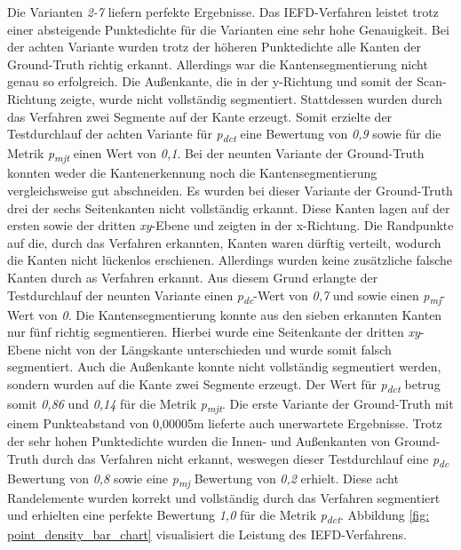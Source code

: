Die Varianten \textit{2-7} liefern perfekte Ergebnisse. Das IEFD-Verfahren leistet trotz einer absteigende Punktedichte für die Varianten eine sehr hohe Genauigkeit. Bei der achten Variante wurden trotz der höheren Punktedichte alle Kanten der Ground-Truth richtig erkannt. Allerdings war die Kantensegmentierung nicht genau so erfolgreich. Die Außenkante, die in der y-Richtung und somit der Scan-Richtung zeigte, wurde nicht vollständig segmentiert. Stattdessen wurden durch das Verfahren zwei Segmente auf der Kante erzeugt. Somit erzielte der Testdurchlauf der achten Variante für \textit{p\textsubscript{dct}} eine Bewertung von \textit{0,9} sowie für die Metrik \textit{p\textsubscript{mjt}} einen Wert von \textit{0,1}. Bei der neunten Variante der Ground-Truth konnten weder die Kantenerkennung noch die Kantensegmentierung vergleichsweise gut abschneiden. Es wurden bei dieser Variante der Ground-Truth drei der sechs Seitenkanten nicht vollständig erkannt. Diese Kanten lagen auf der ersten sowie der dritten \textit{xy}-Ebene und zeigten in der x-Richtung. Die Randpunkte auf die, durch das Verfahren erkannten, Kanten waren dürftig verteilt, wodurch die Kanten nicht lückenlos erschienen. Allerdings wurden keine zusätzliche falsche Kanten durch as Verfahren erkannt. Aus diesem Grund erlangte der Testdurchlauf der neunten Variante einen \textit{p\textsubscript{dc}}-Wert von \textit{0,7} und sowie einen \textit{p\textsubscript{mj}}-Wert von \textit{0}. Die Kantensegmentierung konnte aus den sieben erkannten Kanten nur fünf richtig segmentieren. Hierbei wurde eine Seitenkante der dritten \textit{xy}-Ebene nicht von der Längskante unterschieden und wurde somit falsch segmentiert. Auch die Außenkante konnte nicht vollständig segmentiert werden, sondern wurden auf die Kante zwei Segmente erzeugt. Der Wert für \textit{p\textsubscript{dct}} betrug somit \textit{0,86} und \textit{0,14} für die Metrik \textit{p\textsubscript{mjt}}. Die erste Variante der Ground-Truth mit einem Punkteabstand von 0,00005m lieferte auch unerwartete Ergebnisse. Trotz der sehr hohen Punktedichte wurden die Innen- und Außenkanten von Ground-Truth durch das Verfahren nicht erkannt, weswegen dieser Testdurchlauf eine \textit{p\textsubscript{dc}} Bewertung von \textit{0,8} sowie eine \textit{p\textsubscript{mj}} Bewertung von \textit{0,2} erhielt. Diese acht Randelemente wurden korrekt und vollständig durch das Verfahren segmentiert und erhielten eine perfekte Bewertung \textit{1,0} für die Metrik \textit{p\textsubscript{dct}}. Abbildung \ref{fig: point_density_bar_chart} visualisiert die Leistung des IEFD-Verfahrens.

